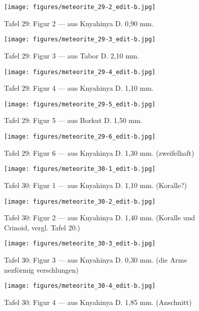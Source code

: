 \documentclass[a4paper, 12pt, oneside]{article}
\begin{document}
\clearpage
\begin{figure}[t]
\texttt{[image: figures/meteorite\_29-2\_edit-b.jpg]}
\caption{Tafel 29: Figur 2 --- aus Knyahinya D. 0,90 mm.}
\centering
\end{figure}
\clearpage
\begin{figure}[t]
\texttt{[image: figures/meteorite\_29-3\_edit-b.jpg]}
\caption{Tafel 29: Figur 3 --- aus Tabor D. 2,10 mm.}
\centering
\end{figure}
\clearpage
\begin{figure}[t]
\texttt{[image: figures/meteorite\_29-4\_edit-b.jpg]}
\caption{Tafel 29: Figur 4 --- aus Knyahinya D. 1,10 mm.}
\centering
\end{figure}
\clearpage
\begin{figure}[t]
\texttt{[image: figures/meteorite\_29-5\_edit-b.jpg]}
\caption{Tafel 29: Figur 5 --- aus Borkut D. 1,50 mm.}
\centering
\end{figure}
\clearpage
\begin{figure}[t]
\texttt{[image: figures/meteorite\_29-6\_edit-b.jpg]}
\caption{Tafel 29: Figur 6 --- aus Knyahinya D. 1,30 mm. (zweifelhaft)}
\centering
\end{figure}
\clearpage
{}
\begin{figure}[t]
\texttt{[image: figures/meteorite\_30-1\_edit-b.jpg]}
\caption{Tafel 30: Figur 1 --- aus Knyahinya D. 1,10 mm. (Koralle?)}
\centering
\end{figure}
\clearpage
\begin{figure}[t]
\texttt{[image: figures/meteorite\_30-2\_edit-b.jpg]}
\caption{Tafel 30: Figur 2 --- aus Knyahinya D. 1,40 mm. (Koralle und Crinoid, vergl. Tafel 20.)}
\centering
\end{figure}
\clearpage
\begin{figure}[t]
\texttt{[image: figures/meteorite\_30-3\_edit-b.jpg]}
\caption{Tafel 30: Figur 3 --- aus Knyahinya D. 0,30 mm. (die Arme nezförmig verschlungen)}
\centering
\end{figure}
\clearpage
\begin{figure}[t]
\texttt{[image: figures/meteorite\_30-4\_edit-b.jpg]}
\caption{Tafel 30: Figur 4 --- aus Knyahinya D. 1,85 mm. (Anschnitt)}
\centering
\end{figure}
\end{document}
